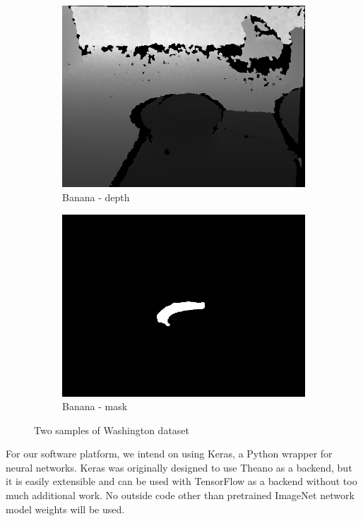 \documentclass[paper=letter, fontsize=12pt]{article}
\begin{document}
\begin{figure}[htbp]
\begin{subfigure}[b]{0.32\linewidth}
		\includegraphics[width=\textwidth]{banana_1_1_100_depth_n}
		\caption{Banana - depth}
	\end{subfigure}
	\begin{subfigure}[b]{0.32\linewidth}
		\includegraphics[width=\textwidth]{banana_1_1_100_mask}
		\caption{Banana - mask}
	\end{subfigure}
	
	\caption{Two samples of Washington dataset}
	\label{fig:washington_samples}
\end{figure}

For our software platform, we intend on using Keras, a Python wrapper for neural
networks. Keras was originally designed to use Theano as a backend, but it is
easily extensible and can be used with TensorFlow as a backend without too much
additional work. No outside code other than pretrained ImageNet network model
weights will be used.
\end{document}
